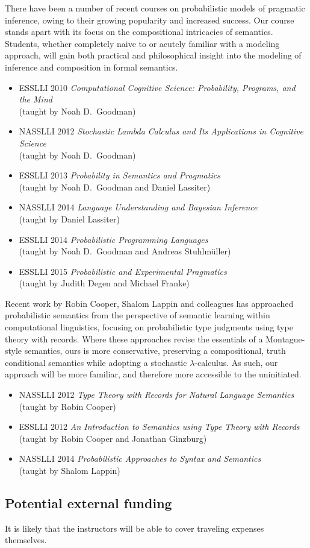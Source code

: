 \documentclass[11pt]{article}
\newcommand{\bit}{\begin{itemize}}
\newcommand{\eit}{\end{itemize}}
\begin{document}
There have been a number of recent courses on probabilistic models of pragmatic inference, owing to their growing popularity and increased success. Our course stands apart with its focus on the compositional intricacies of semantics. Students, whether completely naive to or acutely familiar with a modeling approach, will gain both practical and philosophical insight into the modeling of inference and composition in formal semantics.

\bit
\item ESSLLI 2010 \emph{Computational Cognitive Science: Probability, Programs, and the Mind}\\
(taught by Noah D.~Goodman)
\item NASSLLI 2012 \emph{Stochastic Lambda Calculus and Its Applications in Cognitive Science}\\
(taught by Noah D.~Goodman)
\item ESSLLI 2013 \emph{Probability in Semantics and Pragmatics}\\
(taught by Noah D.~Goodman and Daniel Lassiter)
\item NASSLLI 2014 \emph{Language Understanding and Bayesian Inference}\\
 (taught by Daniel Lassiter)
\item ESSLLI 2014 \emph{Probabilistic Programming Languages}\\
(taught by Noah D.~Goodman and Andreas Stuhlm\"{u}ller)
\item ESSLLI 2015 \emph{Probabilistic and Experimental Pragmatics}\\
(taught by Judith Degen and Michael Franke)
\eit

Recent work by Robin Cooper, Shalom Lappin and colleagues has approached probabilistic semantics from the perspective of semantic learning within computational linguistics, focusing on probabilistic type judgments using type theory with records. Where these approaches revise the essentials of a Montague-style semantics, ours is more conservative, preserving a compositional, truth conditional semantics while adopting a stochastic $\lambda$-calculus. As such, our approach will be more familiar, and therefore more accessible to the uninitiated.

\bit
\item NASSLLI 2012 \emph{Type Theory with Records for Natural Language Semantics}\\
(taught by Robin Cooper)
\item ESSLLI 2012 \emph{An Introduction to Semantics using Type Theory with Records}\\
(taught by Robin Cooper and Jonathan Ginzburg)
\item NASSLLI 2014 \emph{Probabilistic Approaches to Syntax and Semantics}\\
(taught by Shalom Lappin)
\eit

\nocite{cooperetal2014}

\subsection{Potential external funding}

It is likely that the instructors will be able to cover traveling expenses themselves.
\end{document}
